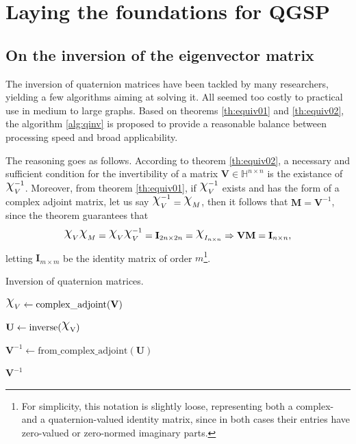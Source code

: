 \section{Laying the foundations for QGSP}

\subsection{On the inversion of the eigenvector matrix}

The inversion of quaternion matrices have been tackled by many researchers, yielding a few algorithms aiming at solving it.  All seemed too costly to practical use in medium to large graphs. Based on theorems \ref{th:equiv01} and \ref{th:equiv02},
the algorithm \ref{alg:qinv} is proposed to provide a reasonable balance between processing speed and broad applicability.

The reasoning goes as follows. According to theorem \ref{th:equiv02}, a necessary and sufficient condition for the invertibility of a matrix $\mathbf{V} \in \mathbb{H}^{n \times n}$ is the existance of $\rchi^{-1}_{V}$. Moreover, from theorem \ref{th:equiv01}, if $\rchi^{-1}_{V}$ exists and has the form of a complex adjoint matrix, let us say $\rchi_{V}^{-1} = \rchi_{M}$, then it follows that $\mathbf{M} = \mathbf{V}^{-1}$, since the theorem guarantees that
\begin{equation}
\rchi_{V} \rchi_{M} = \rchi_{V} \rchi_{V}^{-1} = \mathbf{I}_{2n \times 2n} = \rchi_{I_{n \times n}}
\Rightarrow \mathbf{V} \mathbf{M} = \mathbf{I}_{n \times n},
\end{equation}
letting $\mathbf{I}_{m \times m}$ be the identity matrix of order $m$\footnote{For simplicity, this notation is slightly loose, representing both a complex- and a quaternion-valued identity matrix, since in both cases their entries have zero-valued or zero-normed imaginary parts.}.

\begin{center}
\begin{algorithm}
\caption{Inversion of quaternion matrices.}\label{alg:qinv}
$\rchi_{V} \gets \mathrm{complex\_adjoint(\mathbf{V})}$\;


$\mathbf{U} \gets \mathrm{inverse(\rchi_{V})}$


$\mathbf{V}^{-1} \gets \mathrm{from\_complex\_adjoint}(\mathbf{U})$

\Return $\mathbf{V}^{-1}$
\end{algorithm}
\end{center}


